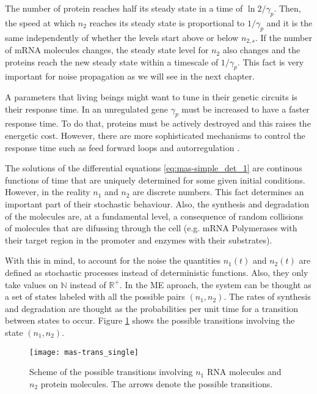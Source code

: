 The number of protein reaches half its steady state in a time of $\ln 2/\gamma_p$. Then, the speed at which $n_2$ reaches its steady state is proportional to $1/\gamma_p$ and it is the same independently of whether the levels start above or below $n_{2,s}$. If the number of mRNA molecules changes, the steady state level for $n_2$ also changes and the proteins reach the new steady state within a timescale of $1/\gamma_p$. This fact is very important for noise propagation as we will see in the next chapter.

A parameters that living beings might want to tune in their genetic circuits is their response time. In an unregulated gene $\gamma_p$ must be increased to have a faster response time. To do that, proteins must be actively destroyed and this raises the energetic cost. However, there are more sophisticated mechanisms to control the response time such as feed forward loops and autorregulation \cite{alon06}.

The solutions of the differential equations \eqref{eq:mas-simple_det_1} are continous functions of time that are uniquely determined for some given initial conditions. However, in the reality $n_1$ and $n_2$ are discrete numbers. This fact determines an important part of their stochastic behaviour. Also, the synthesis and degradation of the molecules are, at a fundamental level, a consequence of random collisions of molecules that are difussing through the cell (e.g. mRNA Polymerases with their target region in the promoter and enzymes with their substrates).

With this in mind, to account for the noise the quantities $n_1(t)$ and $n_2(t)$ are defined as stochastic processes instead of deterministic functions. Also, they only take values on $\mathbb{N}$ instead of $\mathbb{R}^+$. In the ME aproach, the system can be thought as a set of states labeled with all the possible pairs $(n_1,n_2)$. The rates of synthesis and degradation are thought as the probabilities per unit time for a transition between states to occur. Figure \ref{fig:mas-trans_single} shows the possible transitions involving the state $(n_1,n_2)$.

\begin{figure}[H]
  \centering
  \texttt{[image: mas-trans\_single]}
  \caption[Transitions between states for a single gene]{\label{fig:mas-trans_single} Scheme of the possible transitions involving $n_1$ RNA molecules and $n_2$ protein molecules. The arrows denote the possible transitions.}
\end{figure}

